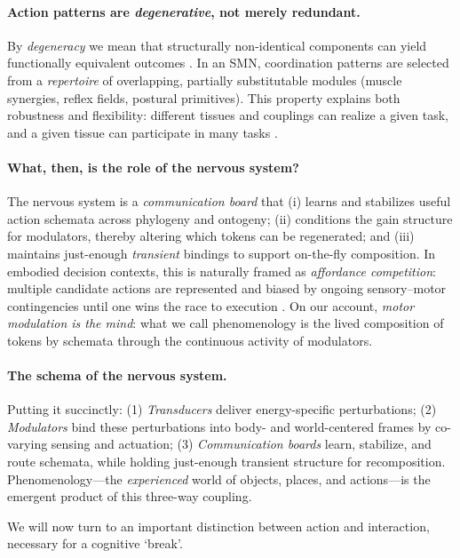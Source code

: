\paragraph{Action patterns are \emph{degenerative}, not merely redundant.}
By \emph{degeneracy} we mean that structurally non-identical components can yield functionally equivalent outcomes \citep{EdelmanGally2001}. In an SMN, coordination patterns are selected from a \emph{repertoire} of overlapping, partially substitutable modules (muscle synergies, reflex fields, postural primitives). This property explains both robustness and flexibility: different tissues and couplings can realize a given task, and a given tissue can participate in many tasks \citep{dAvellaBizzi2005,Kelso1995}.

\paragraph{What, then, is the role of the nervous system?}
The nervous system is a \emph{communication board} that (i) learns and stabilizes useful action schemata across phylogeny and ontogeny; (ii) conditions the gain structure for modulators, thereby altering which tokens can be regenerated; and (iii) maintains just-enough \emph{transient} bindings to support on-the-fly composition. In embodied decision contexts, this is naturally framed as \emph{affordance competition}: multiple candidate actions are represented and biased by ongoing sensory–motor contingencies until one wins the race to execution \citep{PezzuloCisek2016}. On our account, \emph{motor modulation is the mind}: what we call phenomenology is the lived composition of tokens by schemata through the continuous activity of modulators.

\paragraph{The schema of the nervous system.}
Putting it succinctly: (1) \emph{Transducers} deliver energy-specific perturbations; (2) \emph{Modulators} bind these perturbations into body- and world-centered frames by co-varying sensing and actuation; (3) \emph{Communication boards} learn, stabilize, and route schemata, while holding just-enough transient structure for recomposition. Phenomenology---the \emph{experienced} world of objects, places, and actions---is the emergent product of this three-way coupling.


We will now turn to an important distinction between action and interaction, necessary for a cognitive `break'. 
